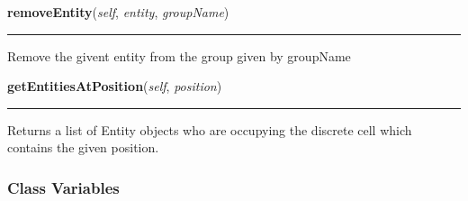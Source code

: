    \label{Birds:GameState:GameState:removeEntity}

    \vspace{0.5ex}

\hspace{.8\funcindent}\begin{boxedminipage}{\funcwidth}

    \raggedright \textbf{removeEntity}(\textit{self}, \textit{entity}, \textit{groupName})

    \vspace{-1.5ex}

    \rule{\textwidth}{0.5\fboxrule}
\setlength{\parskip}{2ex}
    Remove the givent entity from the group given by groupName

\setlength{\parskip}{1ex}
    \end{boxedminipage}

    \label{Birds:GameState:GameState:getEntitiesAtPosition}

    \vspace{0.5ex}

\hspace{.8\funcindent}\begin{boxedminipage}{\funcwidth}

    \raggedright \textbf{getEntitiesAtPosition}(\textit{self}, \textit{position})

    \vspace{-1.5ex}

    \rule{\textwidth}{0.5\fboxrule}
\setlength{\parskip}{2ex}
    Returns a list of Entity objects who are occupying the discrete cell 
    which contains the given position.

\setlength{\parskip}{1ex}
    \end{boxedminipage}



  \subsubsection{Class Variables}

